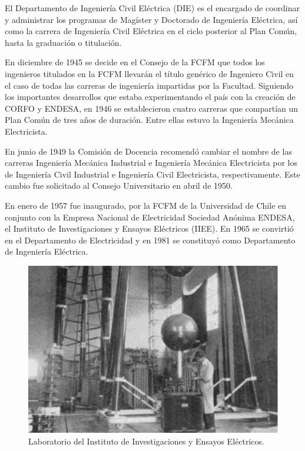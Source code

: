 El Departamento de Ingeniería Civil Eléctrica (DIE) es el encargado de coordinar y administrar los
programas de Magíster y Doctorado de Ingeniería Eléctrica, así como la carrera de Ingeniería Civil
Eléctrica en el ciclo posterior al Plan Común, hasta la graduación o titulación.

En diciembre de 1945 se decide en el Consejo de la FCFM que todos los ingenieros titulados en la
FCFM llevarán el título genérico de Ingeniero Civil en el caso de todas las carreras de ingeniería
impartidas por la Facultad. Siguiendo los importantes desarrollos que estaba experimentando
el país con la creación de CORFO y ENDESA, en 1946 se establecieron cuatro carreras que
compartían un Plan Común de tres años de duración. Entre ellas estuvo la Ingeniería Mecánica
Electricista.

En junio de 1949 la Comisión de Docencia recomendó cambiar el nombre de las carreras
Ingeniería Mecánica Industrial e Ingeniería Mecánica Electricista por los de Ingeniería Civil
Industrial e Ingeniería Civil Electricista, respectivamente. Este cambio fue solicitado al Consejo
Universitario en abril de 1950.

En enero de 1957 fue inaugurado, por la FCFM de la Universidad de Chile en conjunto con la
Empresa Nacional de Electricidad Sociedad Anónima ENDESA, el Instituto de Investigaciones y
Ensayos Eléctricos (IIEE). En 1965 se convirtió en el Departamento de Electricidad y en 1981 se
constituyó como Departamento de Ingeniería Eléctrica.

\begin{figure}[ht!]
\centering
\includegraphics[width=\columnwidth]{./pictures/historia_DIE.png}
\caption{Laboratorio del Instituto de Investigaciones y Ensayos Eléctricos.}
\label{hist_die}
\end{figure}

